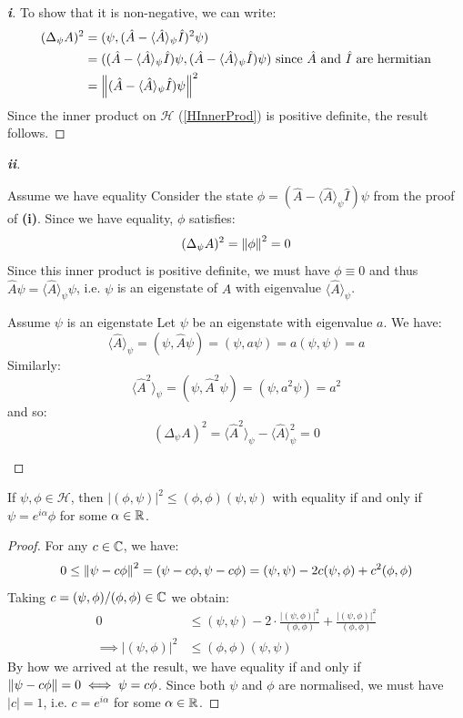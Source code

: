 \documentclass[../main.tex]{subfiles}
\begin{document}
\begin{proof}[\textbf{i}]
  To show that it is non-negative, we can write:
  \begin{align*}
    (\Delta_{\psi} A)^2 &= (\psi, (\hat{A} - \langle \hat{A} \rangle_{\psi} \hat{I})^2 \psi)  \\
                        &= ((\hat{A} - \langle \hat{A} \rangle_{\psi} \hat{I})\psi, (\hat{A} - \langle \hat{A} \rangle_{\psi} \hat{I})\psi) \text{ since $\hat{A}$ and $\hat{I}$ are hermitian} \\
                        &= \left\lVert (\hat{A} - \langle \hat{A} \rangle_{\psi}\hat{I})\psi \right\rVert^2
  \end{align*}
  Since the inner product on $\mathcal{H}$ (\cref{HInnerProd}) is positive definite, the result follows.
\end{proof}
\begin{proof}[\textbf{ii}]
  \begin{proofdirection}{Assume we have equality}
    Consider the state $\phi = (\hat{A} - \langle \hat{A} \rangle_{\psi} \hat{I})\psi$ from the proof of \textbf{(i)}.
    Since we have equality, $\phi$ satisfies:
    \[
      (\Delta_{\psi} A)^2 = \left\lVert \phi \right\rVert^2 = 0
    \]
    Since this inner product is positive definite, we must have $\phi \equiv 0$ and thus $\hat{A} \psi = \langle \hat{A} \rangle_{\psi} \psi$, i.e. $\psi$ is an eigenstate of $A$ with eigenvalue $\langle \hat{A} \rangle_{\psi}$.
  \end{proofdirection}
  \begin{proofdirection}{Assume $\psi$ is an eigenstate}
    Let $\psi$ be an eigenstate with eigenvalue $a$.
    We have:
    \[
      \langle \hat{A} \rangle_{\psi} = (\psi, \hat{A} \psi) = (\psi, a \psi) = a (\psi, \psi) = a
    \]
    Similarly:
    \[
      \langle \hat{A}^2 \rangle_{\psi} = (\psi, \hat{A}^2\psi) = (\psi, a^2 \psi) = a^2
    \]
    and so:
    \[
      (\Delta_{\psi} A)^2 = \langle \hat{A}^2 \rangle_{\psi} - \langle \hat{A} \rangle_{\psi}^2 = 0
    \]
  \end{proofdirection}
\end{proof}
\begin{lemma}
  If $\psi, \phi \in \mathcal{H}$, then $|(\phi, \psi)|^2 \leq (\phi, \phi)(\psi, \psi)$ with equality if and only if $\psi = e^{i\alpha}\phi$ for some $\alpha \in \mathbb{R}$. \label{csIneq}
\end{lemma}
\begin{proof}
  For any $c \in \mathbb{C}$, we have:
  \[
    0 \leq \left\lVert \psi - c\phi \right\rVert^2 = (\psi - c\phi, \psi - c\phi) = (\psi, \psi) - 2c (\psi, \phi) + c^2(\phi, \phi)
  \]
  Taking $c = (\psi, \phi)/(\phi, \phi) \in \mathbb{C}$ we obtain:
  \begin{align*}
    0 &\leq (\psi, \psi) - 2 \cdot \frac{|(\psi, \phi)|^2}{(\phi, \phi)} + \frac{|(\psi, \phi)|^2}{(\phi, \phi)} \\
    \implies |(\psi, \phi)|^2 &\leq (\phi, \phi)(\psi, \psi)
  \end{align*}
  By how we arrived at the result, we have equality if and only if $\left\lVert \psi - c\phi \right\rVert = 0 \iff \psi = c \phi$.
  Since both $\psi$ and $\phi$ are normalised, we must have $|c| = 1$, i.e. $c = e^{i\alpha}$ for some $\alpha \in \mathbb{R}$.
\end{proof}
\end{document}
